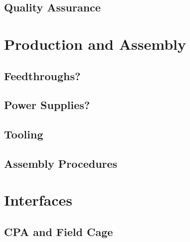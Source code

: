 \subsection{Quality Assurance}
\label{sec:fddp-hv-qa}




\section{Production and Assembly}
\label{sec:fddp-hv-prod-assy}


\subsection{Feedthroughs?}
\label{sec:fddp-hv-feedthroughs}


\subsection{Power Supplies?}
\label{sec:fddp-hv-supplies}



\subsection{Tooling}
\label{sec:fddp-hv-tooling}


\subsection{Assembly Procedures}
\label{sec:fddp-hv-assy}



\section{Interfaces}
\label{sec:fddp-hv-intfc}



\subsection{CPA and Field Cage}
\label{sec:fddp-hv-intfc-cpa-fc}


